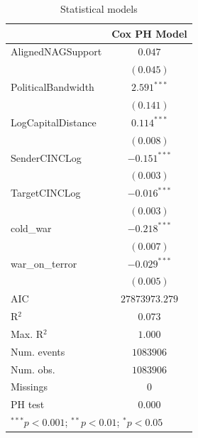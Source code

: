 
\begin{table}
\begin{center}
\begin{tabular}{l c}
\hline
 & Cox PH Model \\
\hline
AlignedNAGSupport  & $0.047$        \\
                   & $(0.045)$      \\
PoliticalBandwidth & $2.591^{***}$  \\
                   & $(0.141)$      \\
LogCapitalDistance & $0.114^{***}$  \\
                   & $(0.008)$      \\
SenderCINCLog      & $-0.151^{***}$ \\
                   & $(0.003)$      \\
TargetCINCLog      & $-0.016^{***}$ \\
                   & $(0.003)$      \\
cold\_war          & $-0.218^{***}$ \\
                   & $(0.007)$      \\
war\_on\_terror    & $-0.029^{***}$ \\
                   & $(0.005)$      \\
\hline
AIC                & $27873973.279$ \\
R$^2$              & $0.073$        \\
Max. R$^2$         & $1.000$        \\
Num. events        & $1083906$      \\
Num. obs.          & $1083906$      \\
Missings           & $0$            \\
PH test            & $0.000$        \\
\hline
\multicolumn{2}{l}{\scriptsize{$^{***}p<0.001$; $^{**}p<0.01$; $^{*}p<0.05$}}
\end{tabular}
\caption{Statistical models}
\label{table:coefficients}
\end{center}
\end{table}
